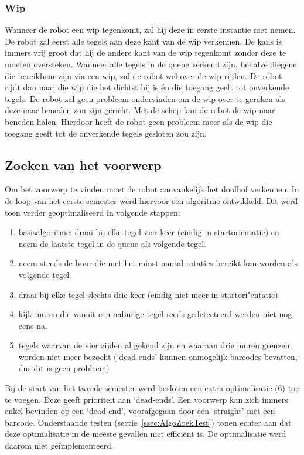 \documentclass[tt3]{penoverslag}
\begin{document}
\subsubsection{Wip}
\label{ssec:AlgoWip}
Wanneer de robot een wip tegenkomt, zal hij deze in eerste instantie niet nemen. De robot zal eerst alle tegels aan deze kant van de wip verkennen. De kans is immers vrij groot dat hij de andere kant van de wip tegenkomt zonder deze te moeten oversteken. Wanneer alle tegels in de queue verkend zijn, behalve diegene die bereikbaar zijn via een wip, zal de robot wel over de wip rijden. De robot rijdt dan naar die wip die het dichtst bij is \'en die toegang geeft tot onverkende tegels. De robot zal geen probleem ondervinden om de wip over te geraken als deze naar beneden zou zijn gericht. Met de schep kan de robot de wip naar beneden halen. Hierdoor heeft de robot geen probleem meer als de wip die toegang geeft tot de onverkende tegels gesloten zou zijn. 


\subsection{Zoeken van het voorwerp} %
\label{ssec:AlgoZoek}
Om het voorwerp te vinden moet de robot aanvankelijk het doolhof verkennen. In de loop van het eerste semester werd hiervoor een algoritme ontwikkeld. Dit werd toen verder geoptimaliseerd in volgende stappen: 

\begin{enumerate}
\item basisalgoritme: draai bij elke tegel vier keer (eindig in startori\"entatie) en neem de laatste tegel in de queue als volgende tegel.
\item neem steeds de buur die met het minst aantal rotaties bereikt kan worden als volgende tegel.
\item draai bij elke tegel slechts drie keer (eindig niet meer in startori"entatie).
\item kijk muren die vanuit een naburige tegel reeds gedetecteerd werden  niet nog eens na.
\item tegels waarvan de vier zijden al gekend zijn en waaraan drie muren grenzen, worden niet meer bezocht (`dead-ends' kunnen onmogelijk barcodes bevatten, dus dit is geen probleem)
\end{enumerate}

Bij de start van het tweede semester werd besloten een extra optimalisatie (6) toe te voegen. Deze geeft prioriteit aan `dead-ends'. Een voorwerp kan zich immers enkel bevinden op een `dead-end', voorafgegaan door een `straight' met een barcode. Onderstaande testen (sectie~\ref{ssec:AlgoZoekTest}) tonen echter aan dat deze optimalisatie in de meeste gevallen niet effici\"ent is. De optimalisatie werd daarom niet ge\"implementeerd.\\
\end{document}
